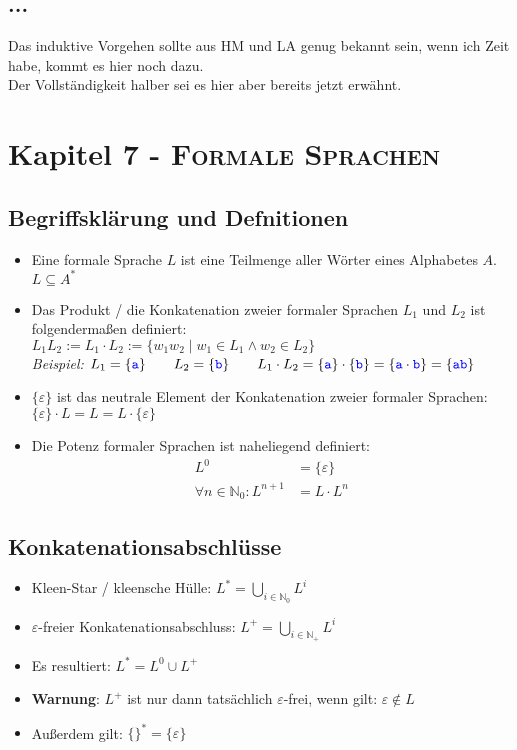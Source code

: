 \documentclass{article}
\newcommand{\N}{\mathbb{N_+}} %
\newcommand{\Nz}{{\mathbb{N}_0}} %
\newcommand{\kapitel}[2]{Kapitel #1 - \textsc{#2}}
\newcommand{\blue}[1]{\textcolor{blue}{#1}}
\newcommand{\strongColor}[1]{\textcolor{strongColor}{#1}}
\newcommand{\strong}[1]{\textbf{\strongColor{#1}}}
\newcommand{\important}[1]{\textcolor{importantColor}{#1}}
\newcommand{\example}[1]{\textit{Beispiel: }#1}
\newcommand{\word}[1]{\blue{\texttt{#1}}}
\newcommand{\set}[1]{\{#1\}}
\begin{document}
\subsection{...}
Das induktive Vorgehen sollte aus HM und LA genug bekannt sein, wenn ich Zeit habe, kommt es hier noch dazu.\\
Der Vollständigkeit halber sei es hier aber bereits jetzt erwähnt.

\newpage
\section{\kapitel{7}{Formale Sprachen}}
\subsection{Begriffsklärung und Defnitionen}
\begin{itemize}
    \item Eine \important{formale Sprache} $L$ ist eine Teilmenge aller Wörter eines Alphabetes $A$.\\
    $L\subseteq A^*$
    \item Das Produkt / die Konkatenation zweier formaler Sprachen $L_1$ und $L_2$ ist folgendermaßen definiert:\\
    $L_1L_2 := L_1\cdot L_2 := \set{w_1w_2 \mid w_1 \in L_1 \land w_2 \in L_2}$\\
    \example{$L_1=\set{\word{a}} \qquad L_2=\set{\word{b}} \qquad L_1\cdot L_2=\set{\word{a}}\cdot\set{\word{b}} = \set{\word{a}\cdot\word{b}} = \set{\word{ab}}$}
    \item $\set{\varepsilon}$ ist das neutrale Element der Konkatenation zweier formaler Sprachen:\\
    $\set{\varepsilon}\cdot L = L = L\cdot\set{\varepsilon}$
    \item Die Potenz formaler Sprachen ist naheliegend definiert:
    \begin{align}
        L^0 &= \set{\varepsilon}\\
        \forall n\in\Nz: L^{n+1}&=L\cdot L^n
    \end{align}
\end{itemize}
\subsection{Konkatenationsabschlüsse}
\begin{itemize}
    \item \important{Kleen-Star} / \important{kleensche Hülle}: 
    $L^* = \displaystyle{\bigcup_{i\in\Nz}}L^i$
    \item \important{$\varepsilon$-freier Konkatenationsabschluss}:
    $L^+ = \displaystyle{\bigcup_{i\in\N}}L^i$
    \item Es resultiert: $L^* = L^0 \cup L^+$
    \item \strong{Warnung}: $L^+$ ist nur dann tatsächlich $\varepsilon$-frei, wenn gilt: $\varepsilon\notin L$
    \item Außerdem gilt: $\set{}^*=\set{\varepsilon}$
\end{itemize}
\end{document}
